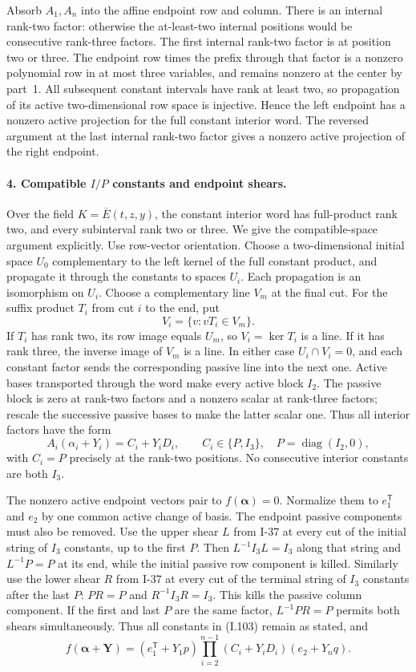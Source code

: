 Absorb $A_1,A_n$ into the affine endpoint row and column. There
is an internal rank-two factor: otherwise the at-least-two
internal positions would be consecutive rank-three factors.
The first internal rank-two factor is at position two or three.
The endpoint row times the prefix through that factor is a
nonzero polynomial row in at most three variables, and remains
nonzero at the center by part~1. All subsequent constant
intervals have rank at least two, so propagation of its active
two-dimensional row space is injective. Hence the left endpoint
has a nonzero active projection for the full constant interior
word. The reversed argument at the last internal rank-two
factor gives a nonzero active projection of the right endpoint.

\paragraph{4. Compatible $I/P$ constants and endpoint shears.}
Over the field $K=\overline E(t,z,y)$, the constant interior word
has full-product rank two, and every subinterval rank two or
three. We give the compatible-space argument explicitly.
Use row-vector orientation. Choose a two-dimensional initial
space $U_0$ complementary to the left kernel of the full
constant product, and propagate it through the constants to
spaces $U_i$. Each propagation is an isomorphism on $U_i$.
Choose a complementary line $V_m$ at the final cut. For the
suffix product $T_i$ from cut $i$ to the end, put
\[
 V_i=\{v:vT_i\in V_m\}.
\]
If $T_i$ has rank two, its row image equals $U_m$, so
$V_i=\ker T_i$ is a line. If it has rank three, the inverse
image of $V_m$ is a line. In either case $U_i\cap V_i=0$,
and each constant factor sends the corresponding passive line
into the next one. Active bases transported through the word
make every active block $I_2$. The passive block is zero at
rank-two factors and a nonzero scalar at rank-three factors;
rescale the successive passive bases to make the latter scalar
one. Thus all interior factors have the form
\[
 A_i(\alpha_i+Y_i)=C_i+Y_iD_i,
 \qquad C_i\in\{P,I_3\},\quad P=\operatorname{diag}(I_2,0),
 \tag{I.103}
\]
with $C_i=P$ precisely at the rank-two positions. No consecutive
interior constants are both $I_3$.

The nonzero active endpoint vectors pair to
$f(\boldsymbol\alpha)=0$. Normalize them to $e_1^{\mathsf T}$
and $e_2$ by one common active change of basis. The endpoint
passive components must also be removed. Use the upper shear
$L$ from I-37 at every cut of the initial string of $I_3$
constants, up to the first $P$. Then
$L^{-1}I_3L=I_3$ along that string and $L^{-1}P=P$ at its end,
while the initial passive row component is killed. Similarly
use the lower shear $R$ from I-37 at every cut of the terminal
string of $I_3$ constants after the last $P$:
$PR=P$ and $R^{-1}I_3R=I_3$. This kills the passive column
component. If the first and last $P$ are the same factor,
$L^{-1}PR=P$ permits both shears simultaneously. Thus all
constants in (I.103) remain as stated, and
\[
 f(\boldsymbol\alpha+\mathbf Y)
 =(e_1^{\mathsf T}+Y_1p)
   \prod_{i=2}^{n-1}(C_i+Y_iD_i)
   (e_2+Y_nq).
 \tag{I.104}
\]

